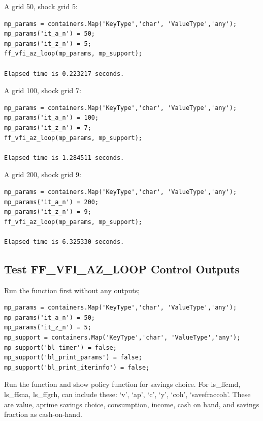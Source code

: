 \documentclass[
]{book}
\begin{document}
A grid 50, shock grid 5:

\begin{verbatim}
mp_params = containers.Map('KeyType','char', 'ValueType','any');
mp_params('it_a_n') = 50;
mp_params('it_z_n') = 5;
ff_vfi_az_loop(mp_params, mp_support);

Elapsed time is 0.223217 seconds.
\end{verbatim}

A grid 100, shock grid 7:

\begin{verbatim}
mp_params = containers.Map('KeyType','char', 'ValueType','any');
mp_params('it_a_n') = 100;
mp_params('it_z_n') = 7;
ff_vfi_az_loop(mp_params, mp_support);

Elapsed time is 1.284511 seconds.
\end{verbatim}

A grid 200, shock grid 9:

\begin{verbatim}
mp_params = containers.Map('KeyType','char', 'ValueType','any');
mp_params('it_a_n') = 200;
mp_params('it_z_n') = 9;
ff_vfi_az_loop(mp_params, mp_support);

Elapsed time is 6.325330 seconds.
\end{verbatim}

\hypertarget{test-ff_vfi_az_loop-control-outputs}{%
\subsection{Test FF\_VFI\_AZ\_LOOP Control Outputs}\label{test-ff_vfi_az_loop-control-outputs}}

Run the function first without any outputs;

\begin{verbatim}
mp_params = containers.Map('KeyType','char', 'ValueType','any');
mp_params('it_a_n') = 50;
mp_params('it_z_n') = 5;
mp_support = containers.Map('KeyType','char', 'ValueType','any');
mp_support('bl_timer') = false;
mp_support('bl_print_params') = false;
mp_support('bl_print_iterinfo') = false;
\end{verbatim}

Run the function and show policy function for savings choice. For
ls\_ffcmd, ls\_ffsna, ls\_ffgrh, can include these: `v', `ap', `c', `y',
`coh', `savefraccoh'. These are value, aprime savings choice,
consumption, income, cash on hand, and savings fraction as cash-on-hand.
\end{document}
